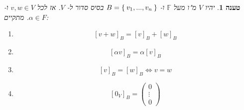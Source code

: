 \documentclass[12pt]{report}
\theoremstyle{plain}
\newtheorem{proposition}[theorem]{טענה}
\theoremstyle{definition}
\newcommand{\F}{\mathbb{F}}
\newcommand{\0}{\mathbf{0}}
\begin{document}
\begin{proposition}\label{prop:coordinates-linear}
יהיו
$V$
מ"ו מעל
$\F$
ו-
$B=\Set{v_1,...,v_n}$
בסיס סדור ל-
$V$.
אז לכל
$v,w\in V$
ו-
$\alpha\in F$.
מתקיים:

\begin{enumerate}[label=\alph*.]
\item 
$$[v+w]_B=[v]_B+[w]_B$$


\item 
$$[\alpha v]_B=\alpha [v]_B$$


\item 
$$[v]_B=[w]_B \iff v=w$$


\item 
$$
[0_V]_B=\begin{pmatrix}
0 \\
\vdots \\
0
\end{pmatrix}
$$    


\end{enumerate}
\end{proposition}
\end{document}
